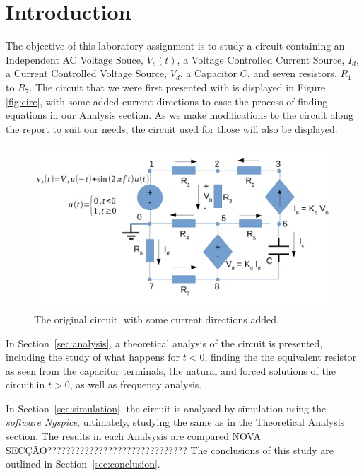 \newpage
\section{Introduction}
\label{sec:introduction}

The objective of this laboratory assignment is to study a circuit containing an Independent AC Voltage Souce, $V_s(t)$, a Voltage Controlled Current Source, $I_d$, a Current Controlled Voltage Source, $V_d$, a Capacitor $C$, and seven resistors, $R_1$ to $R_7$. The circuit that we were first presented with is displayed in Figure \ref{fig:circ}, with some added current directions to ease the process of finding equations in our Analysis section. As we make modifications to the circuit along the report to suit our needs, the circuit used for those will also be displayed.

\begin{figure}[h] \centering
\includegraphics[width=0.6\linewidth]{t2-original.pdf}
\caption{The original circuit, with some current directions added.}
\label{fig1}
\end{figure}

In Section~\ref{sec:analysis}, a theoretical analysis of the circuit is
presented, including the study of what happens for $t<0$, finding the the equivalent resistor as seen from the capacitor
terminals, the natural and forced solutions of the circuit in $t>0$, as well as frequency analysis.

In Section~\ref{sec:simulation}, the circuit is analysed by
simulation using the \textit{software Ngspice}, ultimately, studying the same as in the Theoretical Analysis section.
The results in each Analsysis are compared NOVA SECÇÃO??????????????????????????????
The conclusions of this study are outlined in
Section~\ref{sec:conclusion}.
